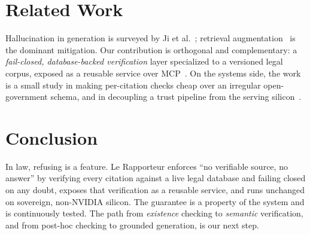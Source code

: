 \documentclass[sigconf, nonacm]{acmart}
\begin{document}
\section{Related Work}
\label{sec:related}

Hallucination in generation is surveyed by Ji et al.~\cite{ji2023hallucination};
retrieval augmentation~\cite{lewis2020rag} is the dominant mitigation. Our
contribution is orthogonal and complementary: a \emph{fail-closed, database-backed
verification} layer specialized to a versioned legal corpus, exposed as a
reusable service over MCP~\cite{mcp2024}. On the systems side, the work is a
small study in making per-citation checks cheap over an irregular open-government
schema, and in decoupling a trust pipeline from the serving
silicon~\cite{modularmax2024, qualcommcloudai100}.

\section{Conclusion}
In law, refusing is a feature. Le Rapporteur enforces ``no verifiable source,
no answer'' by verifying every citation against a live legal database and
failing closed on any doubt, exposes that verification as a reusable service,
and runs unchanged on sovereign, non-NVIDIA silicon. The guarantee is a
property of the system and is continuously tested. The path from
\emph{existence} checking to \emph{semantic} verification, and from
post-hoc checking to grounded generation, is our next step.



\end{document}
